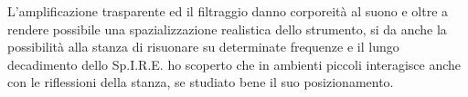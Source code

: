L'amplificazione trasparente ed il filtraggio danno corporeità al suono e oltre a rendere possibile una spazializzazione realistica dello strumento, si da anche la possibilità alla stanza di risuonare su determinate frequenze e il lungo decadimento dello Sp.I.R.E. ho scoperto che in ambienti piccoli interagisce anche con le riflessioni della stanza, se studiato bene il suo posizionamento.
